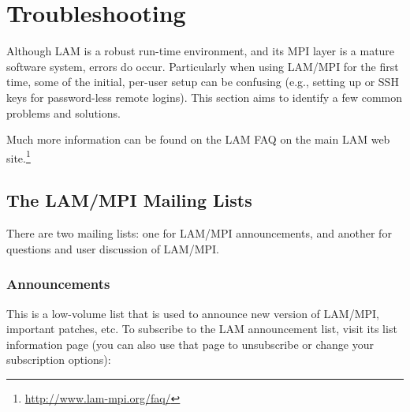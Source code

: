 %
% 
%
%

\chapter{Troubleshooting}
\label{sec:troubleshooting}

Although LAM is a robust run-time environment, and its MPI layer is a
mature software system, errors do occur.  Particularly when using
LAM/MPI for the first time, some of the initial, per-user setup can be
confusing (e.g., setting up  or SSH keys for
password-less remote logins).  This section aims to identify a few
common problems and solutions.

Much more information can be found on the LAM FAQ on the main LAM web
site.\footnote{\url{http://www.lam-mpi.org/faq/}}


\section{The LAM/MPI Mailing Lists}
\label{troubleshooting:mailing-lists}

There are two mailing lists: one for LAM/MPI announcements, and
another for questions and user discussion of LAM/MPI.


\subsection{Announcements}
  
This is a low-volume list that is used to announce new version of
LAM/MPI, important patches, etc.  To subscribe to the LAM announcement
list, visit its list information page (you can also use that page to
unsubscribe or change your subscription options):

